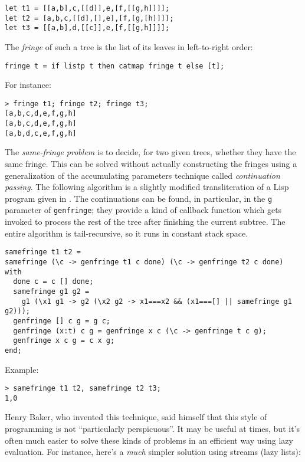 \documentclass[a4paper,12pt]{article}
\begin{document}
\begin{lstlisting}
let t1 = [[a,b],c,[[d]],e,[f,[[g,h]]]];
let t2 = [a,b,c,[[d],[],e],[f,[g,[h]]]];
let t3 = [[a,b],d,[[c]],e,[f,[[g,h]]]];
\end{lstlisting}

\noindent The \emph{fringe} of such a tree is the list of its leaves in
left-to-right order:

\begin{lstlisting}
fringe t = if listp t then catmap fringe t else [t];
\end{lstlisting}

\noindent For instance:

\begin{lstlisting}
> fringe t1; fringe t2; fringe t3;
[a,b,c,d,e,f,g,h]
[a,b,c,d,e,f,g,h]
[a,b,d,c,e,f,g,h]
\end{lstlisting}

The \emph{same-fringe problem} is to decide, for two given trees, whether they
have the same fringe. This can be solved without actually constructing the
fringes using a generalization of the accumulating parameters technique called
\emph{continuation passing}. The following algorithm is a slightly modified
transliteration of a Lisp program given in \cite{Baker93}. The continuations
can be found, in particular, in the \verb|g| parameter of \verb|genfringe|;
they provide a kind of callback function which gets invoked to process the
rest of the tree after finishing the current subtree. The entire algorithm is
tail-recursive, so it runs in constant stack space.

\begin{lstlisting}
samefringe t1 t2 =
samefringe (\c -> genfringe t1 c done) (\c -> genfringe t2 c done) with
  done c = c [] done;
  samefringe g1 g2 =
    g1 (\x1 g1 -> g2 (\x2 g2 -> x1===x2 && (x1===[] || samefringe g1 g2)));
  genfringe [] c g = g c;
  genfringe (x:t) c g = genfringe x c (\c -> genfringe t c g);
  genfringe x c g = c x g;
end;
\end{lstlisting}

\noindent Example:

\begin{lstlisting}
> samefringe t1 t2, samefringe t2 t3;
1,0
\end{lstlisting}

Henry Baker, who invented this technique, said himself that this style of programming is not ``particularly perspicuous''. It may be useful at times, but it's often much easier to solve these kinds of problems in an efficient way using lazy evaluation. For instance, here's a \emph{much} simpler solution using streams (lazy lists):
\end{document}
